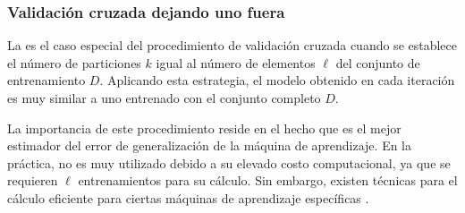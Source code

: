 %
\subsubsection{Validación cruzada dejando uno fuera}
%
La 
es el caso especial del procedimiento de validación cruzada 
cuando se establece el número de particiones $k$ igual al
número de elementos $\ell$ del conjunto de entrenamiento $D$.
Aplicando esta estrategia, el modelo obtenido en cada iteración
es muy similar a uno entrenado con el conjunto completo $D$.

La importancia de este procedimiento reside en el hecho que es el
mejor estimador del error de generalización de la máquina de aprendizaje.
En la práctica, no es muy utilizado debido a su elevado costo
computacional, ya que se requieren $\ell$ entrenamientos para su
cálculo.
Sin embargo, existen técnicas para el cálculo eficiente
para ciertas máquinas de aprendizaje específicas
\cite{chapelle,lee-keerthi}.
